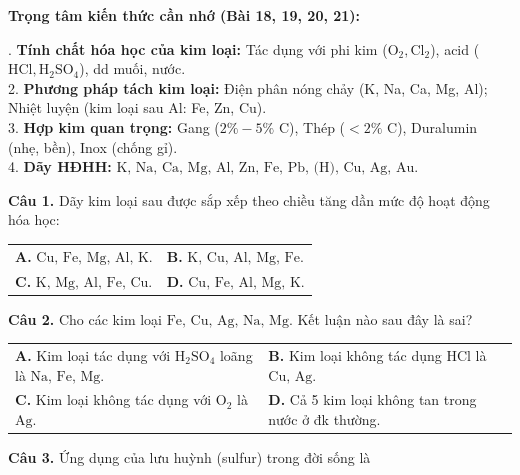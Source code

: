 \documentclass{article}
\begin{document}
\textbf{Trọng tâm kiến thức cần nhớ (Bài 18, 19, 20, 21):}
\vspace{8pt}

\fontsize{24}{32}. \textbf{Tính chất hóa học của kim loại:} Tác dụng với phi kim ($\text{O}_2, \text{Cl}_2$), acid ($\text{HCl}, \text{H}_2\text{SO}_4$), dd muối, nước.\\[6pt]
2. \textbf{Phương pháp tách kim loại:} Điện phân nóng chảy (K, Na, Ca, Mg, Al); Nhiệt luyện (kim loại sau Al: Fe, Zn, Cu).\\[6pt]
3. \textbf{Hợp kim quan trọng:} Gang ($2\%-5\%\text{ C}$), Thép ($<2\%\text{ C}$), Duralumin (nhẹ, bền), Inox (chống gỉ).\\[6pt]
4. \textbf{Dãy HĐHH:} $\text{K, Na, Ca, Mg, Al, Zn, Fe, Pb, (H), Cu, Ag, Au}$.
\vspace*{\fill}
\newpage

\fontsize{28}{36}\selectfont
\textbf{Câu 1.} Dãy kim loại sau được sắp xếp theo chiều tăng dần mức độ hoạt động hóa học:
\vspace{6pt}

\begin{tabularx}{\linewidth}{@{}X X@{}}
\textbf{A.} $\text{Cu, Fe, Mg, Al, K}$. & \textbf{B.} $\text{K, Cu, Al, Mg, Fe}$.\\[8pt]
\textbf{C.} $\text{K, Mg, Al, Fe, Cu}$. & \textbf{D.} $\text{Cu, Fe, Al, Mg, K}$.
\end{tabularx}

\vspace*{\fill}

\textbf{Câu 2.} Cho các kim loại $\text{Fe, Cu, Ag, Na, Mg}$. Kết luận nào sau đây là sai?
\vspace{6pt}

\begin{tabularx}{\linewidth}{@{}X X@{}}
\textbf{A.} Kim loại tác dụng với $\text{H}_2\text{SO}_4$ loãng là $\text{Na, Fe, Mg}$. & \textbf{B.} Kim loại không tác dụng $\text{HCl}$ là $\text{Cu, Ag}$.\\[8pt]
\textbf{C.} Kim loại không tác dụng với $\text{O}_2$ là $\text{Ag}$. & \textbf{D.} Cả 5 kim loại không tan trong nước ở đk thường.
\end{tabularx}
\vspace*{\fill}
\newpage

\fontsize{28}{36}\selectfont
\textbf{Câu 3.} Ứng dụng của lưu huỳnh (sulfur) trong đời sống là
\vspace{6pt}
\end{document}
